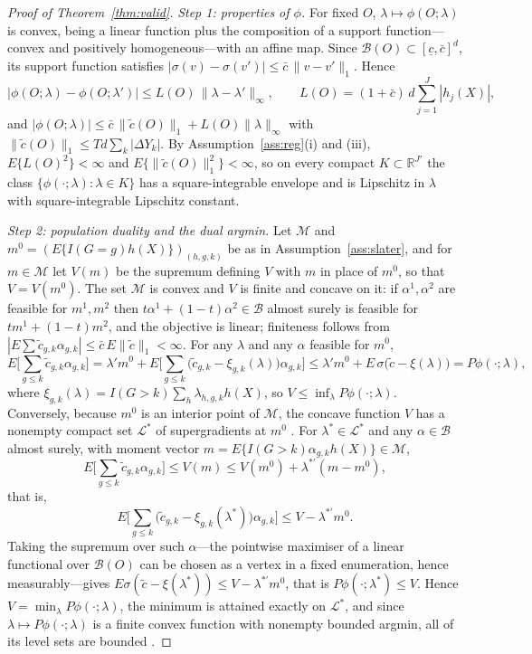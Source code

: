 \documentclass[12pt]{article}
\theoremstyle{remark}
\begin{document}
\begin{proof}[Proof of Theorem~\ref{thm:valid}]
\emph{Step 1: properties of $\phi$.} For fixed $O$, $\lambda \mapsto \phi(O;\lambda)$ is
convex, being a linear function plus the composition of a support function---convex and
positively homogeneous---with an affine map. Since $\mathcal{B}(O) \subset
[\underline c, \bar c]^{d}$, its support function satisfies
$|\sigma(v) - \sigma(v')| \le \bar c\,\|v - v'\|_1$. Hence
\[
|\phi(O;\lambda) - \phi(O;\lambda')| \le L(O)\,\|\lambda - \lambda'\|_\infty,
\qquad
L(O) = (1 + \bar c)\, d \sum_{j=1}^{J} |h_j(X)|,
\]
and $|\phi(O;\lambda)| \le \bar c\,\|\tilde c(O)\|_1 + L(O)\|\lambda\|_\infty$ with
$\|\tilde c(O)\|_1 \le T d \sum_k |\Delta Y_k|$. By Assumption~\ref{ass:reg}(i) and (iii),
$E\{L(O)^2\} < \infty$ and $E\{\|\tilde c(O)\|_1^2\} < \infty$, so on every compact
$K \subset \mathbb{R}^{J'}$ the class $\{\phi(\cdot;\lambda) : \lambda \in K\}$ has a
square-integrable envelope and is Lipschitz in $\lambda$ with square-integrable Lipschitz
constant.

\emph{Step 2: population duality and the dual argmin.} Let $\mathcal{M}$ and $m^0 =
(E\{I(G{=}g)h(X)\})_{(h,g,k)}$ be as in Assumption~\ref{ass:slater}, and for $m \in \mathcal{M}$
let $V(m)$ be the supremum defining $V$ with $m$ in place of $m^0$, so that $V = V(m^0)$.
The set $\mathcal{M}$ is convex and $V$ is finite and concave on it: if $\alpha^1, \alpha^2$
are feasible for $m^1, m^2$ then $t\alpha^1 + (1{-}t)\alpha^2 \in \mathcal{B}$ almost surely
is feasible for $tm^1 + (1{-}t)m^2$, and the objective is linear; finiteness follows from
$|E\sum \tilde c_{g,k}\alpha_{g,k}| \le \bar c\,E\|\tilde c\|_1 < \infty$. For any $\lambda$
and any $\alpha$ feasible for $m^0$,
\[
E\Big[\sum_{g \le k}\tilde c_{g,k}\alpha_{g,k}\Big]
= \lambda' m^0 + E\Big[\sum_{g \le k}\big(\tilde c_{g,k} - \xi_{g,k}(\lambda)\big)\alpha_{g,k}\Big]
\le \lambda' m^0 + E\,\sigma\big(\tilde c - \xi(\lambda)\big) = P\phi(\cdot;\lambda),
\]
where $\xi_{g,k}(\lambda) = I(G{>}k)\sum_h \lambda_{h,g,k}h(X)$, so
$V \le \inf_\lambda P\phi(\cdot;\lambda)$. Conversely, because $m^0$ is an interior point
of $\mathcal{M}$, the concave function $V$ has a nonempty compact set $\mathcal{L}^*$ of
supergradients at $m^0$ \citep[Theorem~23.4]{rockafellar1970convex}. For $\lambda^* \in
\mathcal{L}^*$ and any $\alpha \in \mathcal{B}$ almost surely, with moment vector
$m = E\{I(G{>}k)\alpha_{g,k}h(X)\} \in \mathcal{M}$,
\[
E\Big[\sum_{g \le k}\tilde c_{g,k}\alpha_{g,k}\Big] \le V(m) \le V(m^0) + \lambda^{*\prime}(m - m^0),
\]
that is,
\[
E\Big[\sum_{g \le k}\big(\tilde c_{g,k} - \xi_{g,k}(\lambda^*)\big)\alpha_{g,k}\Big] \le V - \lambda^{*\prime}m^0 .
\]
Taking the supremum over such $\alpha$---the pointwise maximiser of a linear functional
over $\mathcal{B}(O)$ can be chosen as a vertex in a fixed enumeration, hence
measurably---gives $E\sigma(\tilde c - \xi(\lambda^*)) \le V - \lambda^{*\prime}m^0$, that
is $P\phi(\cdot;\lambda^*) \le V$. Hence $V = \min_\lambda P\phi(\cdot;\lambda)$, the
minimum is attained exactly on $\mathcal{L}^*$, and since $\lambda \mapsto P\phi(\cdot;\lambda)$
is a finite convex function with nonempty bounded argmin, all of its level sets are bounded
\citep[Corollary~8.7.1]{rockafellar1970convex}.


\end{proof}
\end{document}
